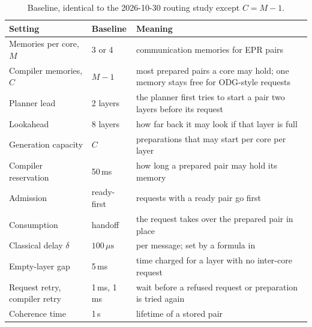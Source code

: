 \documentclass[11pt,a4paper]{report}
\newcommand{\code}[1]{\texttt{\detokenize{#1}}}
\newcommand{\ms}{\,ms}
\newcommand{\us}{\,\ensuremath{\mu\mathrm{s}}}
\begin{document}
\begin{table}[htbp]\centering\small
\begin{tabular}{@{}llp{8.2cm}@{}}\toprule
Setting & Baseline & Meaning \\\midrule
Memories per core, $M$ & 3 or 4 & communication memories for EPR pairs \\
Compiler memories, $C$ & $M-1$ & most prepared pairs a core may hold; one memory stays free for ODG-style requests \\
Planner lead & 2 layers & the planner first tries to start a pair two layers before its request \\
Lookahead & 8 layers & how far back it may look if that layer is full \\
Generation capacity & $C$ & preparations that may start per core per layer \\
Compiler reservation & 50\ms{} & how long a prepared pair may hold its memory \\
Admission & ready-first & requests with a ready pair go first \\
Consumption & handoff & the request takes over the prepared pair in place \\
Classical delay $\delta$ & $100\us{}$ & per message; set by a formula in \code{router_net_topo_adaptive.py} \\
Empty-layer gap & 5\ms{} & time charged for a layer with no inter-core request \\
Request retry, compiler retry & 1\ms{}, 1\ms{} & wait before a refused request or preparation is tried again \\
Coherence time & 1\,s & lifetime of a stored pair \\
\bottomrule\end{tabular}
\caption{Baseline, identical to the 2026-10-30 routing study except $C=M-1$.}
\end{table}
\end{document}
